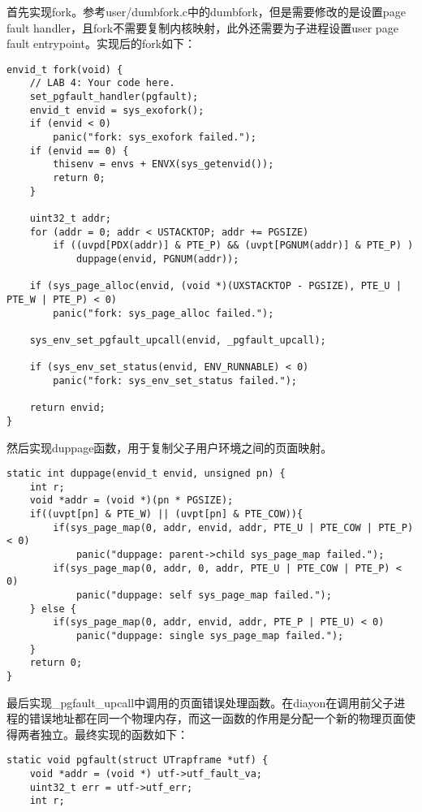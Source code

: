 \begin{exerciseSolution}{12}
    \par 首先实现fork。参考user/dumbfork.c中的dumbfork，但是需要修改的是设置page fault handler，且fork不需要复制内核映射，此外还需要为子进程设置user page fault entrypoint。实现后的fork如下：
    \begin{lstlisting}
envid_t fork(void) {
    // LAB 4: Your code here.
    set_pgfault_handler(pgfault);
    envid_t envid = sys_exofork();
    if (envid < 0)
        panic("fork: sys_exofork failed.");
    if (envid == 0) {
        thisenv = envs + ENVX(sys_getenvid());
        return 0;
    }

    uint32_t addr;
    for (addr = 0; addr < USTACKTOP; addr += PGSIZE)
        if ((uvpd[PDX(addr)] & PTE_P) && (uvpt[PGNUM(addr)] & PTE_P) )
            duppage(envid, PGNUM(addr));

    if (sys_page_alloc(envid, (void *)(UXSTACKTOP - PGSIZE), PTE_U | PTE_W | PTE_P) < 0)
        panic("fork: sys_page_alloc failed.");

    sys_env_set_pgfault_upcall(envid, _pgfault_upcall);

    if (sys_env_set_status(envid, ENV_RUNNABLE) < 0)
        panic("fork: sys_env_set_status failed.");

    return envid;
}
    \end{lstlisting}

    \par 然后实现duppage函数，用于复制父子用户环境之间的页面映射。
    \begin{lstlisting}
static int duppage(envid_t envid, unsigned pn) {
	int r;
    void *addr = (void *)(pn * PGSIZE);
    if((uvpt[pn] & PTE_W) || (uvpt[pn] & PTE_COW)){
        if(sys_page_map(0, addr, envid, addr, PTE_U | PTE_COW | PTE_P) < 0)
            panic("duppage: parent->child sys_page_map failed.");
        if(sys_page_map(0, addr, 0, addr, PTE_U | PTE_COW | PTE_P) < 0)
            panic("duppage: self sys_page_map failed.");
    } else {
        if(sys_page_map(0, addr, envid, addr, PTE_P | PTE_U) < 0)
            panic("duppage: single sys_page_map failed.");
    }
	return 0;
}
    \end{lstlisting}

    \par 最后实现\_pgfault\_upcall中调用的页面错误处理函数。在diayon在调用前父子进程的错误地址都在同一个物理内存，而这一函数的作用是分配一个新的物理页面使得两者独立。最终实现的函数如下：
    \begin{lstlisting}
static void pgfault(struct UTrapframe *utf) {
	void *addr = (void *) utf->utf_fault_va;
	uint32_t err = utf->utf_err;
	int r;


\end{lstlisting}
\end{exerciseSolution}
